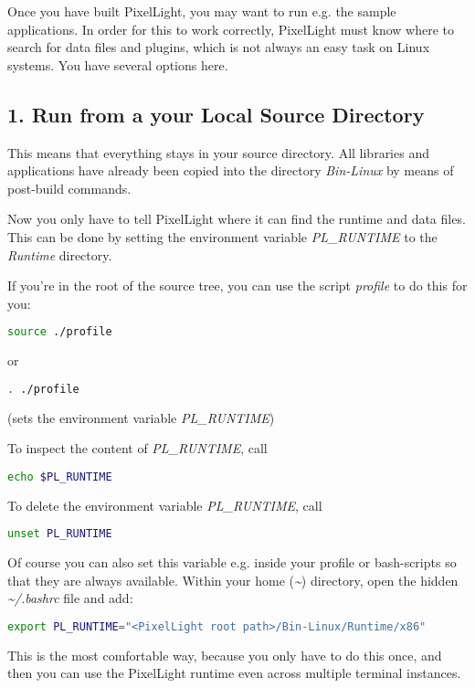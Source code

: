 Once you have built PixelLight, you may want to run e.g. the sample applications. In order for this to work correctly, PixelLight must know where to search for data files and plugins, which is not always an easy task on Linux systems. You have several options here.



\subsection{1. Run from a your Local Source Directory}
This means that everything stays in your source directory. All libraries and applications have already been copied into the directory \emph{Bin-Linux} by means of post-build commands.

Now you only have to tell PixelLight where it can find the runtime and data files. This can be done by setting the environment variable \emph{PL\_RUNTIME} to the \emph{Runtime} directory.

If you're in the root of the source tree, you can use the script \emph{profile} to do this for you:
\begin{lstlisting}[language=sh]
source ./profile
\end{lstlisting}
or
\begin{lstlisting}[language=sh]
. ./profile
\end{lstlisting}
(sets the environment variable \emph{PL\_RUNTIME})

To inspect the content of \emph{PL\_RUNTIME}, call
\begin{lstlisting}[language=sh]
echo $PL_RUNTIME
\end{lstlisting}

To delete the environment variable \emph{PL\_RUNTIME}, call
\begin{lstlisting}[language=sh]
unset PL_RUNTIME
\end{lstlisting}

Of course you can also set this variable e.g. inside your profile or bash-scripts so that they are always available. Within your home (\emph{\textasciitilde}) directory, open the hidden \emph{\textasciitilde /.bashrc} file and add:
\begin{lstlisting}[language=sh]
export PL_RUNTIME="<PixelLight root path>/Bin-Linux/Runtime/x86"
\end{lstlisting}
This is the most comfortable way, because you only have to do this once, and then you can use the PixelLight runtime even across multiple terminal instances.



